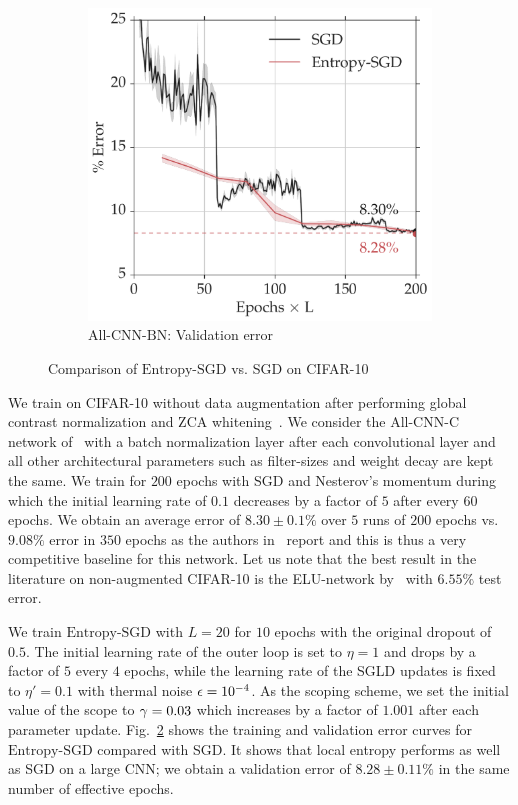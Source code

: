 \documentclass[10pt]{article}
\newcommand{\entropysgd}{\mathrm{Entropy}\textrm{-}\mathrm{SGD}}
\newcommand{\allcnn}{\textrm{All-CNN-BN}}
\begin{document}
\begin{figure}[htp!]
\begin{subfigure}[b]{0.4\textwidth}
        \includegraphics[width=\textwidth]{allcnn_valid.pdf}
        \caption{\small $\allcnn$: Validation error}
        \label{fig:allcnn_valid}
    \end{subfigure}
\caption{\small Comparison of $\entropysgd$ vs. SGD on CIFAR-10}
\label{fig:allcnn}
\end{figure}

We train on CIFAR-10 without data augmentation after performing global contrast normalization and ZCA whitening~\citep{goodfellow2013maxout}. We consider the All-CNN-C network of~\citet{springenberg2014striving} with a batch normalization layer after each convolutional layer and all other architectural parameters such as filter-sizes and weight decay are kept the same. We train for $200$ epochs with SGD and Nesterov's momentum during which the initial learning rate of $0.1$ decreases by a factor of $5$ after every $60$ epochs. We obtain an average error of $8.30 \pm 0.1\%$ over $5$ runs of $200$ epochs vs.\ $9.08\%$ error in $350$ epochs as the authors in~\citet{springenberg2014striving} report and this is thus a very competitive baseline for this network. Let us note that the best result in the literature on non-augmented CIFAR-10 is the ELU-network by~\citet{clevert2015fast} with $6.55\%$ test error.

We train $\entropysgd$ with $L = 20$ for $10$ epochs with the original dropout of $0.5$. The initial learning rate of the outer loop is set to $\eta = 1$ and drops by a factor of $5$ every $4$ epochs, while the learning rate of the SGLD updates is fixed to $\eta' = 0.1$ with thermal noise $\epsilon = 10^{-4}$. As the scoping scheme, we set the initial value of the scope to $\gamma = 0.03$ which increases by a factor of $1.001$ after each parameter update.
%
Fig.~\ref{fig:allcnn} shows the training and validation error curves for $\entropysgd$ compared with SGD. It shows that local entropy performs as well as SGD on a large CNN; we obtain a validation error of $8.28 \pm 0.11 \%$ in the same number of effective epochs.
\end{document}
